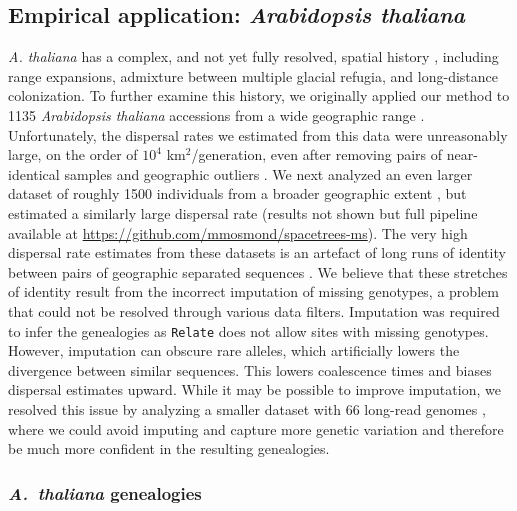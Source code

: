 \documentclass[12pt]{article}
\begin{document}
\subsection*{Empirical application: \textit{Arabidopsis thaliana}}

\textit{A. thaliana} has a complex, and not yet fully resolved, spatial history \citep{fulgione2018archaic,hsu2019postglacial}, including range expansions, admixture between multiple glacial refugia, and long-distance colonization.
To further examine this history, we originally applied our method to 1135 \textit{Arabidopsis thaliana} accessions from a wide geographic range \citep{alonso2016}.
Unfortunately, the dispersal rates we estimated from this data were unreasonably large, on the order of $10^4$ km$^2$/generation, even after removing pairs of near-identical samples and geographic outliers \citep[for more details see our preprint,][]{osmondcoop2021}.
We next analyzed an even larger dataset of roughly 1500 individuals from a broader geographic extent \citep{durvasula2017african}, but estimated a similarly large dispersal rate (results not shown but full pipeline available at \url{https://github.com/mmosmond/spacetrees-ms}).
The very high dispersal rate estimates from these datasets is an artefact of long runs of identity between pairs of geographic separated sequences \citep[see Figure S6 of][]{osmondcoop2021}. We believe that these stretches of identity result from the incorrect imputation of missing genotypes, a problem that could not be resolved through various data filters. Imputation was required to infer the genealogies as \texttt{Relate} does not allow sites with missing genotypes. However, imputation can obscure rare alleles, which artificially lowers the divergence between similar sequences. This lowers coalescence times and biases dispersal estimates upward. While it may be possible to improve imputation, we resolved this issue by analyzing a smaller dataset with 66 long-read genomes \citep{wlodzimierz2023cycles}, where we could avoid imputing and capture more genetic variation \citep{igolkina2024towards} and therefore be much more confident in the resulting genealogies. 

\subsubsection*{\textit{A.\ thaliana} genealogies}
\end{document}
